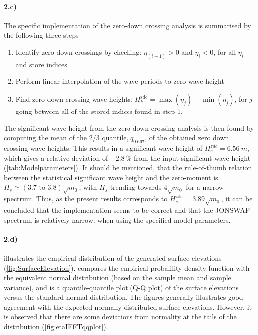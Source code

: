 \paragraph{2.c)} The specific implementation of the zero-down crossing analysis is summarised by the following three steps
\begin{enumerate}
    \item Identify zero-down crossings by checking: $\eta_{(i-1)}> 0$ and $\eta_{i} < 0$, for all $\eta_i$ and store indices
    \item Perform linear interpolation of the wave periods to zero wave height
    \item Find zero-down crossing wave heights: $H_k^{\text{zdc}}=\max(\eta_{j})-\min(\eta_{j})$, for $j$ going between all of the stored indices found in step 1.
\end{enumerate}
The significant wave height from the zero-down crossing analysis is then found by computing the mean of the 2/3 quantile, $q_{0.667}$, of the obtained zero down crossing wave heights. This results in a significant wave height of $H_s^{zdc}=\SI{6.56}{m}$, which gives a relative deviation of $\SI{-2.8}{\percent}$ from the input significant wave height (\cref{tab:Modelparameters}). It should be mentioned, that the rule-of-thumb relation between the statistical significant wave height and the zero-moment is $H_s\simeq(3.7 \text{ to 3.8})\sqrt{m_0}$, with $H_s$ trending towards $4\sqrt{m_0}$ for a narrow spectrum. Thus, as the present results corresponds to $H_s^{\text{zdc}}=3.89\sqrt{m_0}$, it can be concluded that the implementation seems to be correct and that the JONSWAP spectrum is relatively narrow, when using the specified model parameters.     

\paragraph{2.d)}  illustrates the empirical distribution of the generated surface elevations (\cref{fig:SurfaceElevation}).  compares the empirical probalility density function with the equivalent normal distribution (based on the sample mean and sample variance), and  is a quantile-quantile plot (Q-Q plot) of the surface elevations versus the standard normal distribution. The figures generally illustrates good agreement with the expected normally distributed surface elevations. However, it is observed that there are some deviations from normality at the tails of the distribution (\cref{fig:etaIFFTqqplot}).

